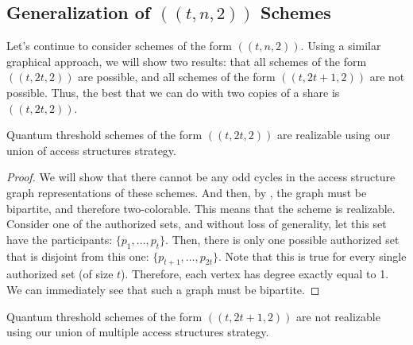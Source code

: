 \subsection{Generalization of $((t,n,2))$ Schemes}

Let's continue to consider schemes of the form $((t,n,2))$. Using a similar graphical approach, we will show two results: that all schemes of the form $((t,2t,2))$ are possible, and all schemes of the form $((t, 2t+1, 2))$ are not possible. Thus, the best that we can do with two copies of a share is $((t,2t,2))$. 

\begin{theorem}
    \label{thm:t-2t-2}
    Quantum threshold schemes of the form $((t,2t,2))$ are realizable using our union of access structures strategy.
\end{theorem}

\begin{proof}
    We will show that there cannot be any odd cycles in the access structure graph representations of these schemes. And then, by , the graph must be bipartite, and therefore two-colorable. This means that the scheme is realizable. Consider one of the authorized sets, and without loss of generality, let this set have the participants: $\{p_1,\dots,p_t\}$. Then, there is only one possible authorized set that is disjoint from this one: $\{p_{t+1},\dots,p_{2t}\}$. Note that this is true for every single authorized set (of size $t$). Therefore, each vertex has degree exactly equal to 1. We can immediately see that such a graph must be bipartite.
\end{proof}

\begin{theorem}
    \label{thm:t-2t+1-2}
    Quantum threshold schemes of the form $((t,2t+1,2))$ are not realizable using our union of multiple access structures strategy.
\end{theorem}
 
